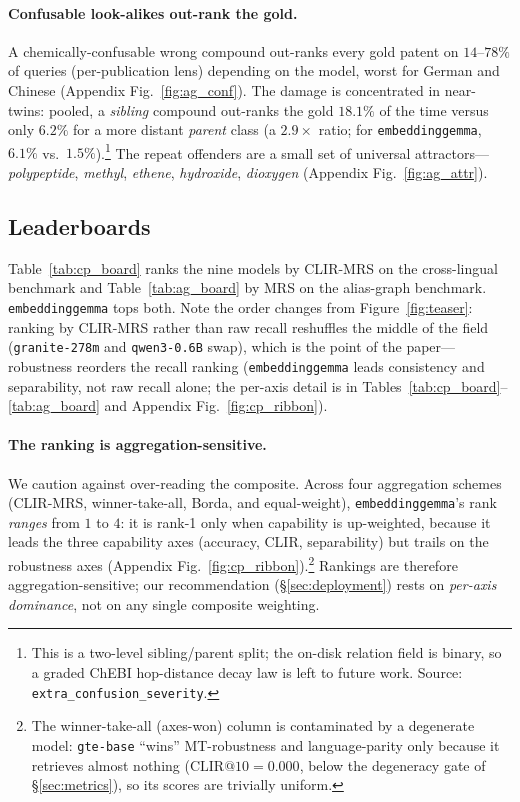 \documentclass[11pt]{article}
\begin{document}
\paragraph{Confusable look-alikes out-rank the gold.}
A chemically-confusable wrong compound out-ranks every gold patent on
$14$--$78\%$ of queries (per-publication lens) depending on the model, worst for
German and Chinese (Appendix Fig.~\ref{fig:ag_conf}). The damage is concentrated in
near-twins: pooled, a \emph{sibling} compound out-ranks the gold $18.1\%$ of the
time versus only $6.2\%$ for a more distant \emph{parent} class (a $2.9\times$
ratio; for \texttt{embeddinggemma}, $6.1\%$ vs.\ $1.5\%$).\footnote{This is a
two-level sibling/parent split; the on-disk relation field is binary, so a
graded ChEBI hop-distance decay law is left to future work. Source:
\texttt{extra\_confusion\_severity}.} The repeat offenders are a small set of
universal attractors---\emph{polypeptide}, \emph{methyl}, \emph{ethene},
\emph{hydroxide}, \emph{dioxygen} (Appendix Fig.~\ref{fig:ag_attr}).

\subsection{Leaderboards}
\label{ssec:boards}

Table~\ref{tab:cp_board} ranks the nine models by CLIR-MRS on the cross-lingual
benchmark and Table~\ref{tab:ag_board} by MRS on the alias-graph benchmark.
\texttt{embeddinggemma} tops both. Note the order changes from
Figure~\ref{fig:teaser}: ranking by CLIR-MRS rather than raw recall reshuffles
the middle of the field (\texttt{granite-278m} and \texttt{qwen3-0.6B} swap),
which is the point of the paper---robustness reorders the recall ranking
(\texttt{embeddinggemma} leads consistency and separability, not raw recall
alone; the per-axis detail is in Tables~\ref{tab:cp_board}--\ref{tab:ag_board}
and Appendix Fig.~\ref{fig:cp_ribbon}).

\paragraph{The ranking is aggregation-sensitive.}
We caution against over-reading the composite. Across four aggregation schemes
(CLIR-MRS, winner-take-all, Borda, and equal-weight), \texttt{embeddinggemma}'s
rank \emph{ranges} from $1$ to $4$: it is rank-1 only when capability is
up-weighted, because it leads the three capability axes (accuracy, CLIR,
separability) but trails on the robustness axes
(Appendix Fig.~\ref{fig:cp_ribbon}).\footnote{The winner-take-all (axes-won) column is
contaminated by a degenerate model: \texttt{gte-base} ``wins'' MT-robustness and
language-parity only because it retrieves almost nothing
($\mathrm{CLIR@10}=0.000$, below the degeneracy gate of \S\ref{sec:metrics}), so
its scores are trivially uniform.}
Rankings are therefore aggregation-sensitive; our recommendation
(\S\ref{sec:deployment}) rests on \emph{per-axis dominance}, not on any single
composite weighting.
\end{document}

